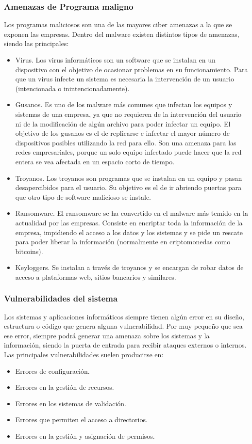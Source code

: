 \documentclass[12pt]{article}
\begin{document}
  \subsubsection*{Amenazas de Programa maligno}
  Los programas maliciosos son una de las mayores ciber amenazas a la que se exponen las empresas. Dentro del malware existen distintos tipos de amenazas, siendo las principales:
  \begin{itemize}
    \item Virus. Los virus informáticos son un software que se instalan en un dispositivo con el objetivo de ocasionar problemas en su funcionamiento. Para que un virus infecte un sistema es necesaria la intervención de un usuario (intencionada o inintencionadamente). 
    \item Gusanos. Es uno de los malware más comunes que infectan los equipos y sistemas de una empresa, ya que no requieren de la intervención del usuario ni de la modificación de algún archivo para poder infectar un equipo. El objetivo de los gusanos es el de replicarse e infectar el mayor número de dispositivos posibles utilizando la red para ello. Son una amenaza para las redes empresariales, porque un solo equipo infectado puede hacer que la red entera se vea afectada en un espacio corto de tiempo. 
    \item Troyanos. Los troyanos son programas que se instalan en un equipo y pasan desapercibidos para el usuario. Su objetivo es el de ir abriendo puertas para que otro tipo de software malicioso se instale. 
    \item Ransomware. El ransomware se ha convertido en el malware más temido en la actualidad por las empresas. Consiste en encriptar toda la información de la empresa, impidiendo el acceso a los datos y los sistemas y se pide un rescate para poder liberar la información (normalmente en criptomonedas como bitcoins). 
    \item Keyloggers. Se instalan a través de troyanos y se encargan de robar datos de acceso a plataformas web, sitios bancarios y similares.
  \end{itemize}

  \subsubsection*{Vulnerabilidades del sistema}
  Los sistemas y aplicaciones informáticos siempre tienen algún error en su diseño, estructura o código que genera alguna vulnerabilidad. Por muy pequeño que sea ese error, siempre podrá generar una amenaza sobre los sistemas y la información, siendo la puerta de entrada para recibir ataques externos o internos. Las principales vulnerabilidades suelen producirse en: 
  \begin{itemize}
    \item Errores de configuración. 
    \item Errores en la gestión de recursos. 
    \item Errores en los sistemas de validación. 
    \item Errores que permiten el acceso a directorios. 
    \item Errores en la gestión y asignación de permisos. 
  \end{itemize}
\end{document}
